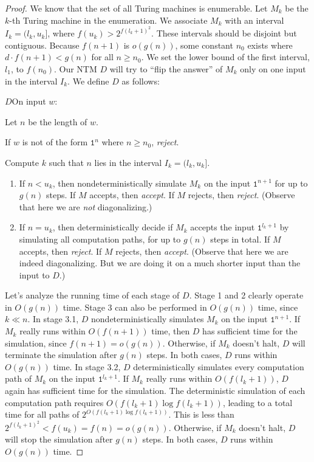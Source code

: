 \documentclass[11pt,twoside=off,numbers=noenddot]{scrbook}
\begin{document}
\begin{proof}
  We know that the set of all Turing machines is enumerable. Let $M_k$ be the $k$-th Turing machine in the enumeration. We associate $M_k$ with an interval $I_k = (l_k, u_k]$, where $f(u_k) > 2^{f(l_k + 1)^2}$. These intervals should be disjoint but contiguous. Because $f(n + 1)$ is $o(g(n))$, some constant $n_0$ exists where $d \cdot f(n + 1) < g(n)$ for all $n \geq n_0$. We set the lower bound of the first interval, $l_1$, to $f(n_0)$. Our NTM $D$ will try to ``flip the answer'' of $M_k$ only on one input in the interval $I_k$. We define $D$ as follows:

  \begin{turing}{$D$}{On input $w$:}
  \item Let $n$ be the length of $w$.
  \item If $w$ is not of the form $\texttt{1}^n$ where $n \geq n_0$, \emph{reject}.
  \item Compute $k$ such that $n$ lies in the interval $I_k = (l_k, u_k]$.
    \begin{enumerate}[label=\theenumi.\arabic*.]
      \item If $n < u_k$, then nondeterministically simulate $M_k$ on the input $\texttt{1}^{n + 1}$ for up to $g(n)$ steps. If $M$ accepts, then \emph{accept}. If $M$ rejects, then \emph{reject}. (Observe that here we are \emph{not} diagonalizing.)
      \item If $n = u_k$, then deterministically decide if $M_k$ accepts the input $\texttt{1}^{l_k + 1}$ by simulating all computation paths, for up to $g(n)$ steps in total. If $M$ accepts, then \emph{reject}. If $M$ rejects, then \emph{accept}. (Observe that here we are indeed diagonalizing. But we are doing it on a much shorter input than the input to $D$.)
    \end{enumerate}
  \end{turing}

  Let's analyze the running time of each stage of $D$. Stage 1 and 2 clearly operate in $O(g(n))$ time. Stage 3 can also be performed in $O(g(n))$ time, since $k \ll n$. In stage 3.1, $D$ nondeterministically simulates $M_k$ on the input $\texttt{1}^{n + 1}$. If $M_k$ really runs within $O(f(n + 1))$ time, then $D$ has sufficient time for the simulation, since $f(n + 1) = o(g(n))$. Otherwise, if $M_k$ doesn't halt, $D$ will terminate the simulation after $g(n)$ steps. In both cases, $D$ runs within $O(g(n))$ time. In stage 3.2, $D$ deterministically simulates every computation path of $M_k$ on the input $\texttt{1}^{l_k + 1}$. If $M_k$ really runs within $O(f(l_k + 1))$, $D$ again has sufficient time for the simulation. The deterministic simulation of each computation path requires $O(f(l_k + 1) \log f(l_k + 1))$, leading to a total time for all paths of $2^{O(f(l_k + 1) \log f(l_k + 1))}$. This is less than $2^{f(l_k + 1)^2} < f(u_k) = f(n) = o(g(n))$. Otherwise, if $M_k$ doesn't halt, $D$ will stop the simulation after $g(n)$ steps. In both cases, $D$ runs within $O(g(n))$ time.


\end{proof}
\end{document}
